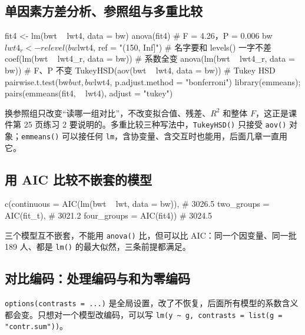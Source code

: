 \subsection{单因素方差分析、参照组与多重比较}
\begin{RCode}
fit4 <- lm(bwt ~ lwt4, data = bw)
anova(fit4)                                       # F = 4.26，P = 0.006
bw$lwt4_r <- relevel(bw$lwt4, ref = "(150, Inf]") # 名字要和 levels() 一字不差
coef(lm(bwt ~ lwt4_r, data = bw))                 # 系数全变
anova(lm(bwt ~ lwt4_r, data = bw))                # F、P 不变
TukeyHSD(aov(bwt ~ lwt4, data = bw))              # Tukey HSD
pairwise.t.test(bw$bwt, bw$lwt4, p.adjust.method = "bonferroni")
library(emmeans); pairs(emmeans(fit4, ~ lwt4), adjust = "tukey")
\end{RCode}
换参照组只改变“读哪一组对比”，不改变拟合值、残差、$R^2$ 和整体 $F$，这正是课件第 25 页练习 2 要说明的。多重比较三种写法中，\Verb|TukeyHSD()| 只接受 \Verb|aov()| 对象；\Verb|emmeans()| 可以接任何 \Verb|lm|，含协变量、含交互时也能用，后面几章一直用它。

\subsection{用 AIC 比较不嵌套的模型}
\begin{RCode}[R · 连续、二分、四分]
c(continuous  = AIC(lm(bwt ~ lwt, data = bw)),    # 3026.5
  two_groups  = AIC(fit_t),                        # 3021.2
  four_groups = AIC(fit4))                         # 3024.5
\end{RCode}
三个模型互不嵌套，不能用 \Verb|anova()| 比，但可以比 AIC：同一个因变量、同一批 189 人、都是 \Verb|lm()| 的最大似然，三条前提都满足。

\subsection{对比编码：处理编码与和为零编码}
\Verb|options(contrasts = ...)| 是全局设置，改了不恢复，后面所有模型的系数含义都会变。只想对一个模型改编码，可以写 \Verb|lm(y ~ g, contrasts = list(g = "contr.sum"))|。

